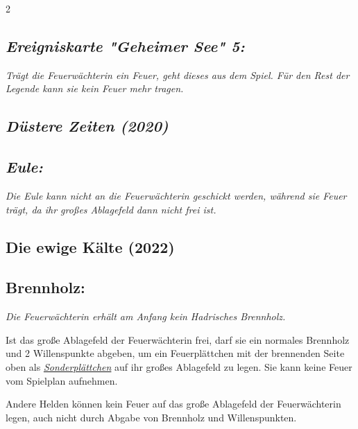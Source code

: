 \documentclass[10pt, a4paper, oneside]{book}
\newcommand{\fan}[1]{\textit{#1}}
\begin{document}
\begin{multicols*}{2}
\begin{bgcolor}
\subsection{\fan{Ereigniskarte "Geheimer See" 5:}}

\fan{Trägt die Feuerwächterin ein Feuer, geht dieses aus dem Spiel. Für den Rest der Legende kann sie kein Feuer mehr tragen.}

\end{bgcolor}






\begin{bgcolor}[color-DZ]
\section{\fan{Düstere Zeiten (2020)}}


\subsection{\fan{Eule:}}

\fan{Die Eule kann nicht an die Feuerwächterin geschickt werden, während sie Feuer trägt, da ihr großes Ablagefeld dann nicht frei ist.}

\end{bgcolor}



\columnbreak


\begin{bgcolor}
\section{Die ewige Kälte (2022)}

\subsection{Brennholz:}

\fan{Die Feuerwächterin erhält am Anfang kein Hadrisches Brennholz.}

Ist das große Ablagefeld der Feuerwächterin frei, darf sie ein normales Brennholz und 2 Willenspunkte abgeben, um ein Feuerplättchen mit der brennenden Seite oben als \hyperref[Gegenstände und Sonderplättchen]{\fan{Sonderplättchen}} auf ihr großes Ablagefeld zu legen. Sie kann keine Feuer vom Spielplan aufnehmen.

Andere Helden können kein Feuer auf das große Ablagefeld der Feuerwächterin legen, auch nicht durch Abgabe von Brennholz und Willenspunkten.
\supercite{105294}





\end{bgcolor}
\end{multicols*}
\end{document}
